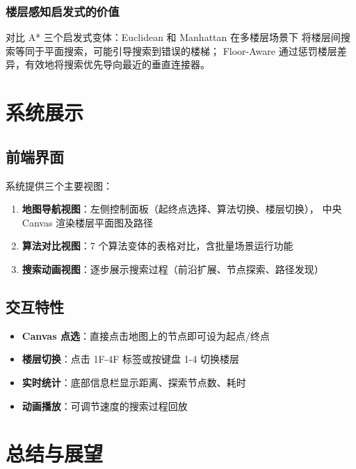 \documentclass[11pt,a4paper]{ctexart}
\begin{document}
\subsubsection{楼层感知启发式的价值}

对比 A* 三个启发式变体：Euclidean 和 Manhattan 在多楼层场景下
将楼层间搜索等同于平面搜索，可能引导搜索到错误的楼梯；
Floor-Aware 通过惩罚楼层差异，有效地将搜索优先导向最近的垂直连接器。

\section{系统展示}

\subsection{前端界面}

系统提供三个主要视图：

\begin{enumerate}
    \item \textbf{地图导航视图}：左侧控制面板（起终点选择、算法切换、楼层切换），
          中央 Canvas 渲染楼层平面图及路径
    \item \textbf{算法对比视图}：7 个算法变体的表格对比，含批量场景运行功能
    \item \textbf{搜索动画视图}：逐步展示搜索过程（前沿扩展、节点探索、路径发现）
\end{enumerate}

\subsection{交互特性}

\begin{itemize}
    \item \textbf{Canvas 点选}：直接点击地图上的节点即可设为起点/终点
    \item \textbf{楼层切换}：点击 1F-4F 标签或按键盘 1-4 切换楼层
    \item \textbf{实时统计}：底部信息栏显示距离、探索节点数、耗时
    \item \textbf{动画播放}：可调节速度的搜索过程回放
\end{itemize}

\section{总结与展望}
\end{document}
